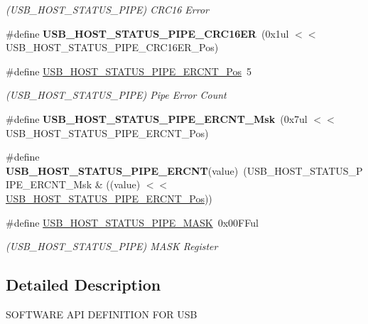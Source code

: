 \begin{DoxyCompactItemize}
\begin{DoxyCompactList}\small\item\em (U\+S\+B\+\_\+\+H\+O\+S\+T\+\_\+\+S\+T\+A\+T\+U\+S\+\_\+\+P\+I\+P\+E) C\+R\+C16 Error \end{DoxyCompactList}\item 
\hypertarget{group___s_a_m_l21___u_s_b_ga551986433f5f3d2807b033c93cb6ac83}{}\#define {\bfseries U\+S\+B\+\_\+\+H\+O\+S\+T\+\_\+\+S\+T\+A\+T\+U\+S\+\_\+\+P\+I\+P\+E\+\_\+\+C\+R\+C16\+E\+R}~(0x1ul $<$$<$ U\+S\+B\+\_\+\+H\+O\+S\+T\+\_\+\+S\+T\+A\+T\+U\+S\+\_\+\+P\+I\+P\+E\+\_\+\+C\+R\+C16\+E\+R\+\_\+\+Pos)\label{group___s_a_m_l21___u_s_b_ga551986433f5f3d2807b033c93cb6ac83}

\item 
\hypertarget{group___s_a_m_l21___u_s_b_gaa7030c0aabad16cf53fb60b6e164c8d6}{}\#define \hyperlink{group___s_a_m_l21___u_s_b_gaa7030c0aabad16cf53fb60b6e164c8d6}{U\+S\+B\+\_\+\+H\+O\+S\+T\+\_\+\+S\+T\+A\+T\+U\+S\+\_\+\+P\+I\+P\+E\+\_\+\+E\+R\+C\+N\+T\+\_\+\+Pos}~5\label{group___s_a_m_l21___u_s_b_gaa7030c0aabad16cf53fb60b6e164c8d6}

\begin{DoxyCompactList}\small\item\em (U\+S\+B\+\_\+\+H\+O\+S\+T\+\_\+\+S\+T\+A\+T\+U\+S\+\_\+\+P\+I\+P\+E) Pipe Error Count \end{DoxyCompactList}\item 
\hypertarget{group___s_a_m_l21___u_s_b_gafbbac4e1ab41aa9e7bde0755feff037c}{}\#define {\bfseries U\+S\+B\+\_\+\+H\+O\+S\+T\+\_\+\+S\+T\+A\+T\+U\+S\+\_\+\+P\+I\+P\+E\+\_\+\+E\+R\+C\+N\+T\+\_\+\+Msk}~(0x7ul $<$$<$ U\+S\+B\+\_\+\+H\+O\+S\+T\+\_\+\+S\+T\+A\+T\+U\+S\+\_\+\+P\+I\+P\+E\+\_\+\+E\+R\+C\+N\+T\+\_\+\+Pos)\label{group___s_a_m_l21___u_s_b_gafbbac4e1ab41aa9e7bde0755feff037c}

\item 
\hypertarget{group___s_a_m_l21___u_s_b_ga059124df09148faa84a90d49975f86da}{}\#define {\bfseries U\+S\+B\+\_\+\+H\+O\+S\+T\+\_\+\+S\+T\+A\+T\+U\+S\+\_\+\+P\+I\+P\+E\+\_\+\+E\+R\+C\+N\+T}(value)~(U\+S\+B\+\_\+\+H\+O\+S\+T\+\_\+\+S\+T\+A\+T\+U\+S\+\_\+\+P\+I\+P\+E\+\_\+\+E\+R\+C\+N\+T\+\_\+\+Msk \& ((value) $<$$<$ \hyperlink{group___s_a_m_l21___u_s_b_gaa7030c0aabad16cf53fb60b6e164c8d6}{U\+S\+B\+\_\+\+H\+O\+S\+T\+\_\+\+S\+T\+A\+T\+U\+S\+\_\+\+P\+I\+P\+E\+\_\+\+E\+R\+C\+N\+T\+\_\+\+Pos}))\label{group___s_a_m_l21___u_s_b_ga059124df09148faa84a90d49975f86da}

\item 
\hypertarget{group___s_a_m_l21___u_s_b_ga10314511f58df955f60ce4ab0180d2f1}{}\#define \hyperlink{group___s_a_m_l21___u_s_b_ga10314511f58df955f60ce4ab0180d2f1}{U\+S\+B\+\_\+\+H\+O\+S\+T\+\_\+\+S\+T\+A\+T\+U\+S\+\_\+\+P\+I\+P\+E\+\_\+\+M\+A\+S\+K}~0x00\+F\+Ful\label{group___s_a_m_l21___u_s_b_ga10314511f58df955f60ce4ab0180d2f1}

\begin{DoxyCompactList}\small\item\em (U\+S\+B\+\_\+\+H\+O\+S\+T\+\_\+\+S\+T\+A\+T\+U\+S\+\_\+\+P\+I\+P\+E) M\+A\+S\+K Register \end{DoxyCompactList}\end{DoxyCompactItemize}


\subsection{Detailed Description}
S\+O\+F\+T\+W\+A\+R\+E A\+P\+I D\+E\+F\+I\+N\+I\+T\+I\+O\+N F\+O\+R U\+S\+B 